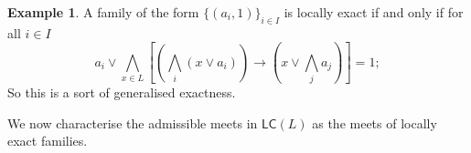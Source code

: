\documentclass[11pt,a4paper,reqno]{amsart}
\newcommand{\tbigwedge}{\mathop{\textstyle \bigwedge }}%
\newcommand{\tbigvee}{\mathop{\textstyle \bigvee }}%
\def\cl{\mathfrak{c}}
\def\op{\mathfrak{o}}
\newtheorem{lemma}[theorem]{Lemma}
\theoremstyle{definition}
\newtheorem{example}[theorem]{Example}
\theoremstyle{remark}
\newcommand{\mf}{\mathsf}
\newcommand{\mi}{\mathit}
\newcommand{\we}{\wedge}
\newcommand{\ve}{\vee}
\begin{document}
{\begin{example}
A family of the form $\{(a_i,1)\}_{i\in I}$ is locally exact if and only if for all $i\in I$
$$ a_i\vee \tbigwedge_{x\in L}[ (\tbigwedge_i (x\vee a_i))\to (x\vee \tbigwedge_j a_j) ]= 1;$$
So this is a sort of generalised exactness.
\end{example}

We now characterise the admissible meets in $\mf{LC}(L)$ as the meets of locally exact families. 
}
\end{document}
